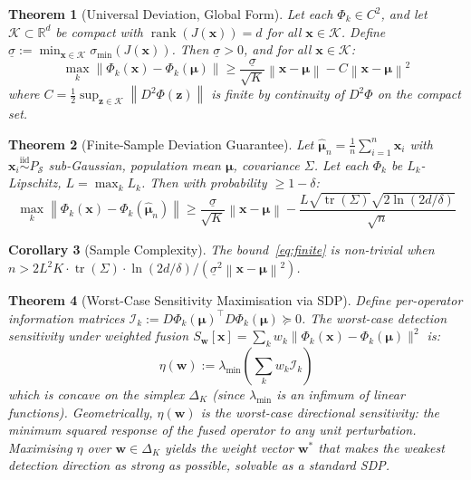 \documentclass{article}
\newtheorem{theorem}{Theorem}
\newtheorem{corollary}[theorem]{Corollary}
\newcommand{\R}{\mathbb{R}}
\newcommand{\Nset}{\mathcal{S}}  %
\newcommand{\norm}[1]{\left\lVert#1\right\rVert}
\DeclareMathOperator{\tr}{tr}
\DeclareMathOperator{\rank}{rank}
\begin{document}
\begin{theorem}[Universal Deviation, Global Form]
\label{thm:global}
Let each $\Phi_k \in C^2$, and let $\mathcal{K} \subset \R^d$ be compact with $\rank(J(\mathbf{x})) = d$ for all $\mathbf{x} \in \mathcal{K}$. Define
$\underline{\sigma} := \min_{\mathbf{x} \in \mathcal{K}} \sigma_{\min}(J(\mathbf{x}))$.
Then $\underline{\sigma} > 0$, and for all $\mathbf{x} \in \mathcal{K}$:
\begin{equation}
\max_{k} \norm{\Phi_k(\mathbf{x}) - \Phi_k(\bm{\mu})} \geq \frac{\underline{\sigma}}{\sqrt{K}} \norm{\mathbf{x} - \bm{\mu}} - C\norm{\mathbf{x} - \bm{\mu}}^2
\label{eq:global}
\end{equation}
where $C = \frac{1}{2}\sup_{\mathbf{z} \in \mathcal{K}} \norm{D^2\Phi(\mathbf{z})}$ is finite by continuity of $D^2\Phi$ on the compact set.
\end{theorem}

\begin{theorem}[Finite-Sample Deviation Guarantee]
\label{thm:finite}
Let $\hat{\bm{\mu}}_n = \frac{1}{n}\sum_{i=1}^n \mathbf{x}_i$ with $\mathbf{x}_i \overset{\text{iid}}{\sim} P_\Nset$ sub-Gaussian, population mean $\bm{\mu}$, covariance $\Sigma$. Let each $\Phi_k$ be $L_k$-Lipschitz, $L = \max_k L_k$. Then with probability $\geq 1 - \delta$:
\begin{equation}
\max_{k} \norm{\Phi_k(\mathbf{x}) - \Phi_k(\hat{\bm{\mu}}_n)} \geq \frac{\underline{\sigma}}{\sqrt{K}}\norm{\mathbf{x} - \bm{\mu}} - \frac{L\sqrt{\tr(\Sigma)}\sqrt{2\ln(2d/\delta)}}{\sqrt{n}}
\label{eq:finite}
\end{equation}
\end{theorem}

\begin{corollary}[Sample Complexity]
\label{cor:sample}
The bound~\eqref{eq:finite} is non-trivial when $n > 2L^2 K \cdot \tr(\Sigma) \cdot \ln(2d/\delta) / (\underline{\sigma}^2 \norm{\mathbf{x}-\bm{\mu}}^2)$.
\end{corollary}

\begin{theorem}[Worst-Case Sensitivity Maximisation via SDP]
\label{thm:sdp}
Define per-operator information matrices $\mathcal{I}_k := D\Phi_k(\bm{\mu})^\top D\Phi_k(\bm{\mu}) \succeq 0$. The worst-case detection sensitivity under weighted fusion $S_\mathbf{w}[\mathbf{x}] = \sum_k w_k \|\Phi_k(\mathbf{x}) - \Phi_k(\bm{\mu})\|^2$ is:
\begin{equation}
\eta(\mathbf{w}) := \lambda_{\min}\!\left(\textstyle\sum_k w_k \mathcal{I}_k\right)
\end{equation}
which is concave on the simplex $\Delta_K$ (since $\lambda_{\min}$ is an infimum of linear functions). Geometrically, $\eta(\mathbf{w})$ is the worst-case directional sensitivity: the minimum squared response of the fused operator to any unit perturbation. Maximising $\eta$ over $\mathbf{w} \in \Delta_K$ yields the weight vector $\mathbf{w}^*$ that makes the weakest detection direction as strong as possible, solvable as a standard SDP.
\end{theorem}
\end{document}
